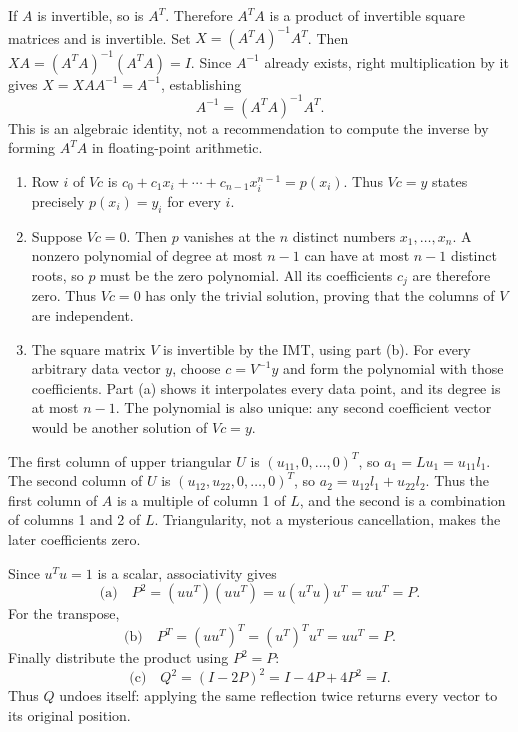 If $A$ is invertible, so is $A^T$. Therefore $A^TA$ is a product of
invertible square matrices and is invertible.
Set $X=(A^TA)^{-1}A^T$. Then
$XA=(A^TA)^{-1}(A^TA)=I$.
Since $A^{-1}$ already exists, right multiplication by it gives
$X=XAA^{-1}=A^{-1}$, establishing
\[
 \boxed{A^{-1}=(A^TA)^{-1}A^T}.
\]
This is an algebraic identity, not a recommendation to compute the inverse
by forming $A^TA$ in floating-point arithmetic.

\begin{enumerate}[label=(\alph*)]
\item Row $i$ of $Vc$ is
$c_0+c_1x_i+\cdots+c_{n-1}x_i^{n-1}=p(x_i)$.
Thus $Vc=y$ states precisely $p(x_i)=y_i$ for every $i$.
\item Suppose $Vc=0$. Then $p$ vanishes at the $n$ distinct numbers
$x_1,\ldots,x_n$. A nonzero polynomial of degree at most $n-1$ can have
at most $n-1$ distinct roots, so $p$ must be the zero polynomial.
All its coefficients $c_j$ are therefore zero. Thus $Vc=0$ has only the
trivial solution, proving that the columns of $V$ are independent.
\item The square matrix $V$ is invertible by the IMT, using part (b).
For every arbitrary data vector $y$, choose $c=V^{-1}y$ and form the
polynomial with those coefficients. Part (a) shows it interpolates every
data point, and its degree is at most $n-1$. The polynomial is also unique:
any second coefficient vector would be another solution of $Vc=y$.
\end{enumerate}

The first column of upper triangular $U$ is $(u_{11},0,\ldots,0)^T$,
so $a_1=Lu_1=u_{11}l_1$.
The second column of $U$ is $(u_{12},u_{22},0,\ldots,0)^T$, so
$a_2=u_{12}l_1+u_{22}l_2$.
Thus the first column of $A$ is a multiple of column 1 of $L$, and the
second is a combination of columns 1 and 2 of $L$.
Triangularity, not a mysterious cancellation, makes the later coefficients zero.

Since $u^Tu=1$ is a scalar, associativity gives
\[
 \text{(a)}\quad P^2=(uu^T)(uu^T)=u(u^Tu)u^T=uu^T=P.
\]
For the transpose,
\[
 \text{(b)}\quad P^T=(uu^T)^T=(u^T)^Tu^T=uu^T=P.
\]
Finally distribute the product using $P^2=P$:
\[
 \text{(c)}\quad Q^2=(I-2P)^2=I-4P+4P^2=I.
\]
Thus $Q$ undoes itself: applying the same reflection twice returns
every vector to its original position.


